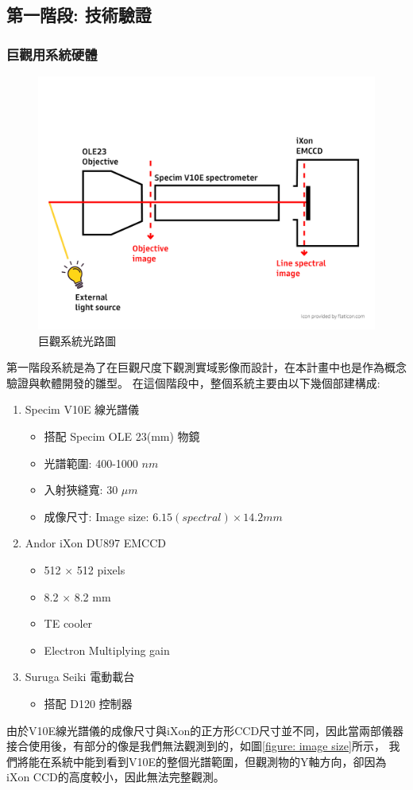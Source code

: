 \documentclass[12pt]{article}
\begin{document}
\subsection{第一階段: 技術驗證}
\subsubsection{巨觀用系統硬體}
\begin{figure}
    \centering
    \includegraphics[width = 0.75\linewidth]{lightPath.jpg}
    \caption{巨觀系統光路圖}
\end{figure}
第一階段系統是為了在巨觀尺度下觀測實域影像而設計，在本計畫中也是作為概念驗證與軟體開發的雛型。
在這個階段中，整個系統主要由以下幾個部建構成:
\begin{enumerate}
    \item Specim V10E 線光譜儀
          \begin{itemize}
              \item 搭配 Specim OLE 23(mm) 物鏡
              \item 光譜範圍: 400-1000 $nm$
              \item 入射狹縫寬: 30 $\mu m$
              \item 成像尺寸: Image size: $6.15(spectral) \times 14.2 mm$
          \end{itemize}
    \item Andor iXon DU897 EMCCD
          \begin{itemize}
              \item 512 $\times$ 512 pixels
              \item 8.2 $\times$ 8.2 mm
              \item TE cooler
              \item Electron Multiplying gain
          \end{itemize}
    \item Suruga Seiki 電動載台
          \begin{itemize}
              \item 搭配 D120 控制器
          \end{itemize}
\end{enumerate}
由於V10E線光譜儀的成像尺寸與iXon的正方形CCD尺寸並不同，因此當兩部儀器接合使用後，有部分的像是我們無法觀測到的，如圖\ref{figure: image size}所示，
我們將能在系統中能到看到V10E的整個光譜範圍，但觀測物的Y軸方向，卻因為iXon CCD的高度較小，因此無法完整觀測。
\end{document}
